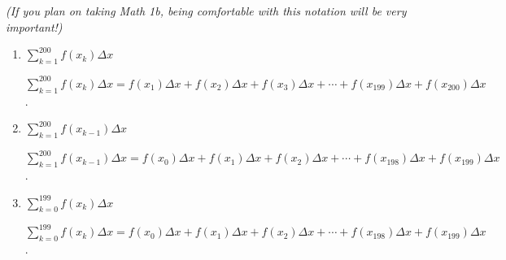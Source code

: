 \documentclass{article}
\begin{document}
\begin{enumerate}
  \emph{(If you plan on taking Math 1b, being comfortable with this
    notation will be very important!)}

\begin{enumerate}


    \item
\begin{problem}[\vfill]
        $\displaystyle \sum_{k=1}^{200} f(x_k) \Delta x$
      \end{problem}

      \begin{solution}
        $\displaystyle \sum_{k=1}^{200} f(x_k) \Delta x = f(x_1)\Delta x +
        f(x_2)\Delta x + f(x_3)\Delta x + \cdots + f(x_{199})\Delta x +
        f(x_{200})\Delta x$. 
      \end{solution}

    \item
\begin{problem}[\vfill]
        $\displaystyle \sum_{k=1}^{200} f(x_{k-1}) \Delta x$        
      \end{problem}

      \begin{solution}
        $\displaystyle \sum_{k=1}^{200} f(x_{k-1}) \Delta x = f(x_0)
        \Delta x + f(x_1) \Delta x + f(x_2) \Delta x + \cdots + f(x_{198})
        \Delta x + f(x_{199}) \Delta x$.        
      \end{solution}

    \item
\begin{problem}[\vfill]
        $\displaystyle \sum_{k=0}^{199} f(x_k) \Delta x$        
      \end{problem}

      \begin{solution}
        $\displaystyle \sum_{k=0}^{199} f(x_k) \Delta x = f(x_0) \Delta x
        + f(x_1) \Delta x + f(x_2) \Delta x + \cdots + f(x_{198}) \Delta x
        + f(x_{199}) \Delta x$.
      \end{solution}



\end{enumerate}
\end{enumerate}
\end{document}
